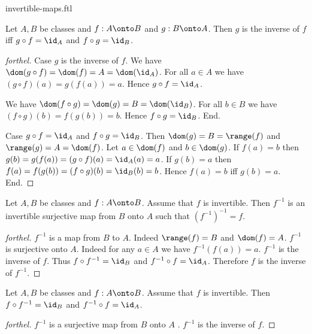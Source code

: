 \documentclass{naproche-library}
\begin{document}
\begin{smodule}{invertible-maps.ftl}
  \begin{proposition}[forthel,id=FOUNDATIONS_09_7840743571849216,printid]
    Let $A, B$ be classes and $f : A \onto B$ and $g : B \onto A$.
    Then $g$ is the inverse of $f$ iff $g \circ f = \id_{A}$ and $f \circ g = \id_{B}$.
  \end{proposition}
  \begin{proof}[forthel]
    Case $g$ is the inverse of $f$.
      We have
      $\dom(g \circ f)
        = \dom(f)
        = A
        = \dom(\id_{A})$.
      For all $a \in A$ we have
      $(g \circ f)(a)
        = g(f(a))
        = a$.
      Hence $g \circ f = \id_{A}$.

      We have
      $\dom(f \circ g)
        = \dom(g)
        = B
        = \dom(\id_{B})$.
      For all $b \in B$ we have
      $(f \circ g)(b)
        = f(g(b))
        = b$.
      Hence $f \circ g = \id_{B}$.
    End.

    Case $g \circ f = \id_{A}$ and $f \circ g = \id_{B}$.
      Then $\dom(g)
        = B
        = \range(f)$
      and $\range(g)
        = A
        = \dom(f)$.
      Let $a \in \dom(f)$ and $b \in \dom(g)$.
      If $f(a) = b$ then
      $g(b)
        = g(f(a))
        = (g \circ f)(a)
        = \id_{A}(a)
        = a$.
      If $g(b) = a$ then
      $f(a)
        = f(g(b))
        = (f \circ g)(b)
        = \id_{B}(b)
        = b$.
      Hence $f(a) = b$ iff $g(b) = a$.
    End.
  \end{proof}

  \begin{proposition}[forthel,id=FOUNDATIONS_09_8414736098000896,printid]
    Let $A, B$ be classes and $f : A \onto B$.
    Assume that $f$ is invertible.
    Then $f^{-1}$ is an invertible surjective map from $B$ onto $A$ such that $(f^{-1})^{-1} = f$.
  \end{proposition}
  \begin{proof}[forthel]
    $f^{-1}$ is a map from $B$ to $A$.
    Indeed $\range(f) = B$ and $\dom(f) = A$.
    $f^{-1}$ is surjective onto $A$.
    Indeed for any $a \in A$ we have $f^{-1}(f(a)) = a$.
    $f^{-1}$ is the inverse of $f$.
    Thus $f \circ f^{-1} = \id_{B}$ and $f^{-1} \circ f = \id_{A}$.
    Therefore $f$ is the inverse of $f^{-1}$.
  \end{proof}

  \begin{proposition}[forthel,id=FOUNDATIONS_09_4577560740495360,printid]
    Let $A, B$ be classes and $f : A \onto B$.
    Assume that $f$ is invertible.
    Then $f \circ f^{-1} = \id_{B}$ and $f^{-1} \circ f = \id_{A}$.
  \end{proposition}
  \begin{proof}[forthel]
    $f^{-1}$ is a surjective map from $B$ onto $A$ .
    $f^{-1}$ is the inverse of $f$.
  \end{proof}


\end{smodule}
\end{document}
